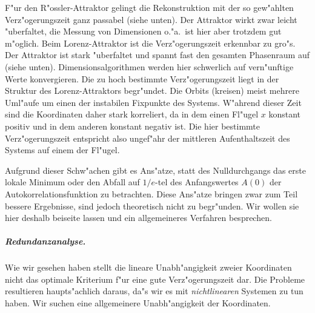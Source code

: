 F"ur den R"ossler-Attraktor gelingt die Rekonstruktion mit der so gew"ahlten
Verz"ogerungszeit ganz passabel (siehe  unten). Der Attraktor wirkt zwar
leicht "uberfaltet, die Messung von Dimensionen o."a.\ ist hier aber trotzdem gut
m"oglich. Beim Lorenz-Attraktor ist die Verz"ogerungszeit erkennbar zu gro"s. Der
Attraktor ist stark "uberfaltet und spannt fast den gesamten Phasenraum auf (siehe
 unten). Dimensionsalgorithmen werden hier schwerlich auf vern"unftige
Werte konvergieren. Die zu hoch bestimmte Verz"ogerungszeit liegt in der Struktur des
Lorenz-Attraktors begr"undet. Die Orbits \naja(kreisen) meist mehrere Uml"aufe um einen
der instabilen Fixpunkte des Systems. W"ahrend dieser Zeit sind die Koordinaten daher
stark korreliert, da in dem einen Fl"ugel $x$ konstant positiv und in dem anderen konstant
negativ ist. Die hier bestimmte Verz"ogerungszeit entspricht also ungef"ahr der mittleren
Aufenthaltszeit des Systems auf einem der Fl"ugel.

Aufgrund dieser Schw"achen gibt es Ans"atze, statt des Nulldurchgangs das erste lokale
Minimum oder den Abfall auf $1/e$-tel des Anfangswertes $A(0)$ der Autokorrelationsfunktion zu betrachten. Diese
Ans"atze bringen zwar zum Teil bessere Ergebnisse, sind jedoch theoretisch nicht zu
begr"unden. Wir wollen sie hier deshalb beiseite lassen und ein allgemeineres Verfahren
besprechen.

\subparagraph{Redundanzanalyse.}  Wie wir gesehen haben stellt die lineare
Un\-ab\-h"an\-gig\-keit zweier Koordinaten nicht das optimale Kriterium f"ur eine gute
Verz"ogerungszeit dar. Die Probleme resultieren haupts"achlich daraus, da"s wir es mit
\emph{nichtlinearen} Systemen zu tun haben. Wir suchen eine allgemeinere Unabh"angigkeit
der Koordinaten.


\comment{Sei $X$ eine beliebige Zufallsvariable und $\Prob_X(i)$ die Wahrscheinlichkeit
  bei einer Messung von $X$ einen Wert im Intervall $[x_i,x_{i+1}[$ zu erhalten. Dann
  betr"agt die mittlere Information einer Messung von $X$}

